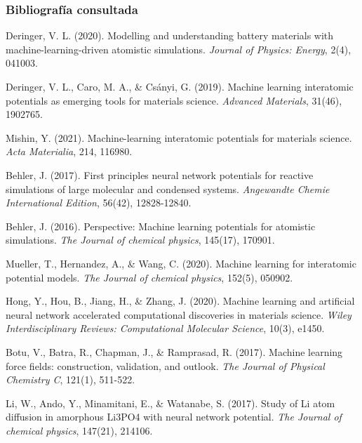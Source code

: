 \documentclass[aspectratio=169]{beamer}
\begin{document}

    \begin{frame}
        \frametitle{Bibliografía consultada}

        \tiny{
            Deringer, V. L. (2020). Modelling and understanding battery 
                materials with machine-learning-driven atomistic simulations.
                \textit{Journal of Physics: Energy}, 2(4), 041003.
            
            Deringer, V. L., Caro, M. A., \& Csányi, G. (2019). Machine 
                learning interatomic potentials as emerging tools for materials 
                science. \textit{Advanced Materials}, 31(46), 1902765.

            Mishin, Y. (2021). Machine-learning interatomic potentials for 
                materials science. \textit{Acta Materialia}, 214, 116980.

            Behler, J. (2017). First principles neural network potentials 
                for reactive simulations of large molecular and condensed systems. 
                \textit{Angewandte Chemie International Edition}, 56(42), 12828-12840.

            Behler, J. (2016). Perspective: Machine learning potentials 
                for atomistic simulations. \textit{The Journal of chemical 
                physics}, 145(17), 170901.

            Mueller, T., Hernandez, A., \& Wang, C. (2020). Machine learning 
                for interatomic potential models. \textit{The Journal of chemical 
                physics}, 152(5), 050902.

            Hong, Y., Hou, B., Jiang, H., \& Zhang, J. (2020). Machine 
                learning and artificial neural network accelerated computational 
                discoveries in materials science. \textit{Wiley Interdisciplinary 
                Reviews: Computational Molecular Science}, 10(3), e1450.

            Botu, V., Batra, R., Chapman, J., \& Ramprasad, R. (2017). 
                Machine learning force fields: construction, validation, and 
                outlook. \textit{The Journal of Physical Chemistry C}, 121(1), 
                511-522.

            Li, W., Ando, Y., Minamitani, E., \& Watanabe, S. (2017). 
                Study of Li atom diffusion in amorphous Li3PO4 with neural 
                network potential. \textit{The Journal of chemical physics}, 
                147(21), 214106.

}
\end{frame}
\end{document}
